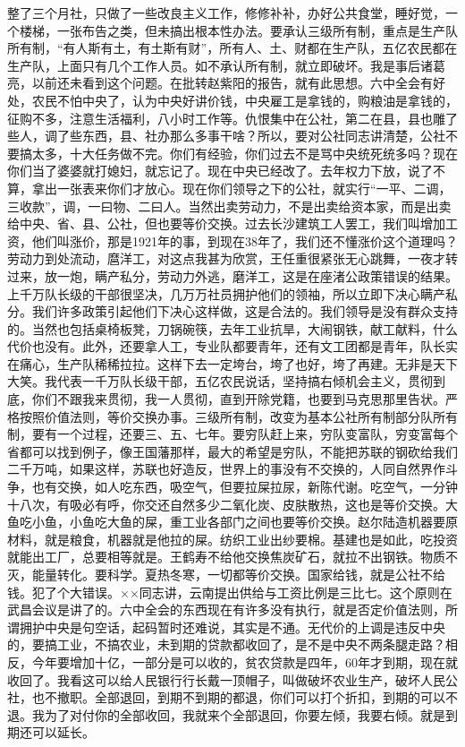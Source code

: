整了三个月社，只做了一些改良主义工作，修修补补，办好公共食堂，睡好觉，一个楼梯，一张布告之类，但未搞出根本性办法。要承认三级所有制，重点是生产队所有制，“有人斯有土，有土斯有财”，所有人、土、财都在生产队，五亿农民都在生产队，上面只有几个工作人员。如不承认所有制，就立即破坏。我是事后诸葛亮，以前还未看到这个问题。在批转赵紫阳的报告，就有此思想。六中全会有好处，农民不怕中央了，认为中央好讲价钱，中央雇工是拿钱的，购粮油是拿钱的，征购不多，注意生活福利，八小时工作等。仇恨集中在公社，第二在县，县也雕了些人，调了些东西，县、社办那么多事干啥？所以，要对公社同志讲清楚，公社不要搞太多，十大任务做不完。你们有经验，你们过去不是骂中央统死统多吗？现在你们当了婆婆就打媳妇，就忘记了。现在中央已经改了。去年权力下放，说了不算，拿出一张表来你们才放心。现在你们领导之下的公社，就实行“一平、二调，三收款”，调，一曰物、二曰人。当然出卖劳动力，不是出卖给资本家，而是出卖给中央、省、县、公社，但也要等价交换。过去长沙建筑工人罢工，我们叫增加工资，他们叫涨价，那是1921年的事，到现在38年了，我们还不懂涨价这个道理吗？劳动力到处流动，麿洋工，对这点我甚为欣赏，王任重很紧张无心跳舞，一夜才转过来，放一炮，瞒产私分，劳动力外逃，磨洋工，这是在座渚公政策错误的结果。上千万队长级的干部很坚决，几万万社员拥护他们的领袖，所以立即下决心瞒产私分。我们许多政策引起他们下决心这样做，这是合法的。我们领导是没有群众支持的。当然也包括桌椅板凳，刀锅碗筷，去年工业抗旱，大闹钢铁，献工献料，什么代价也没有。此外，还要拿人工，专业队都要青年，还有文工团都是青年，队长实在痛心，生产队稀稀拉拉。这样下去一定垮台，垮了也好，垮了再建。无非是天下大笑。我代表一千万队长级干部，五亿农民说话，坚持搞右倾机会主义，贯彻到底，你们不跟我来贯彻，我一人贯彻，直到开除党籍，也要到马克思那里告状。严格按照价值法则，等价交换办事。三级所有制，改变为基本公社所有制部分队所有制，要有一个过程，还要三、五、七年。要穷队赶上来，穷队变富队，穷变富每个省都可以找到例子，像王国藩那样，最大的希望是穷队，不能把苏联的钢砍给我们二千万吨，如果这样，苏联也好造反，世界上的事没有不交换的，人同自然界作斗争，也有交换，如人吃东西，吸空气，但要拉屎拉尿，新陈代谢。吃空气，一分钟十八次，有吸必有呼，你交还自然多少二氧化炭、皮肤散热，这也是等价交换。大鱼吃小鱼，小鱼吃大鱼的屎，重工业各部门之间也要等价交换。赵尔陆造机器要原材料，就是粮食，机器就是他拉的屎。纺织工业出纱要棉。基建也是如此，吃投资就能出工厂，总要相等就是。王鹤寿不给他交换焦炭矿石，就拉不出钢铁。物质不灭，能量转化。要科学。夏热冬寒，一切都等价交换。国家给钱，就是公社不给钱。犯了个大错误。××同志讲，云南提出供给与工资比例是三比七。这个原则在武昌会议是讲了的。六中全会的东西现在有许多没有执行，就是否定价值法则，所谓拥护中央是句空话，起码暂时还难说，其实是不通。无代价的上调是违反中央的，要搞工业，不搞农业，未到期的贷款都收回了，是不是中央不两条腿走路？相反，今年要增加十亿，一部分是可以收的，贫农贷款是四年，60年才到期，现在就收回了。我看这可以给人民银行行长戴一顶帽子，叫做破坏农业生产，破坏人民公社，也不撤职。全部退回，到期不到期的都退，你们可以打个折扣，到期的可以不退。我为了对付你的全部收回，我就来个全部退回，你要左倾，我要右倾。就是到期还可以延长。

